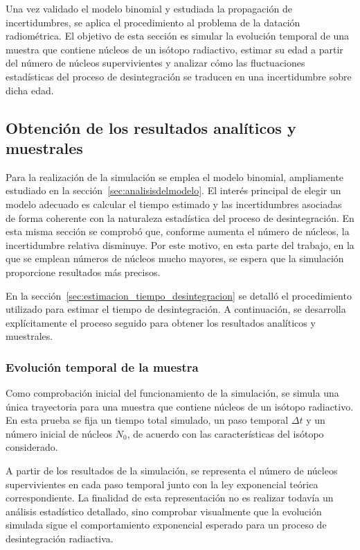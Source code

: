 \documentclass[12pt,a4paper]{article}
\begin{document}
Una vez validado el modelo binomial y estudiada la propagación de incertidumbres, se aplica el procedimiento al problema de la datación radiométrica. El objetivo de esta sección es simular la evolución temporal de una muestra que contiene núcleos de un isótopo radiactivo, estimar su edad a partir del número de núcleos supervivientes y analizar cómo las fluctuaciones estadísticas del proceso de desintegración se traducen en una incertidumbre sobre dicha edad.

\subsection{Obtención de los resultados analíticos y muestrales}
\label{sec:obtencion_de_resultados}

Para la realización de la simulación se emplea el modelo binomial, ampliamente estudiado en la sección~\ref{sec:analisisdelmodelo}. El interés principal de elegir un modelo adecuado es calcular el tiempo estimado y las incertidumbres asociadas de forma coherente con la naturaleza estadística del proceso de desintegración. En esta misma sección se comprobó que, conforme aumenta el número de núcleos, la incertidumbre relativa disminuye. Por este motivo, en esta parte del trabajo, en la que se emplean números de núcleos mucho mayores, se espera que la simulación proporcione resultados más precisos.

En la sección~\ref{sec:estimacion_tiempo_desintegracion} se detalló el procedimiento utilizado para estimar el tiempo de desintegración. A continuación, se desarrolla explícitamente el proceso seguido para obtener los resultados analíticos y muestrales.

\subsubsection{Evolución temporal de la muestra}

Como comprobación inicial del funcionamiento de la simulación, se simula una única trayectoria para una muestra que contiene núcleos de un isótopo radiactivo. En esta prueba se fija un tiempo total simulado, un paso temporal $\Delta t$ y un número inicial de núcleos $N_0$, de acuerdo con las características del isótopo considerado.

A partir de los resultados de la simulación, se representa el número de núcleos supervivientes en cada paso temporal junto con la ley exponencial teórica correspondiente. La finalidad de esta representación no es realizar todavía un análisis estadístico detallado, sino comprobar visualmente que la evolución simulada sigue el comportamiento exponencial esperado para un proceso de desintegración radiactiva.
\end{document}
